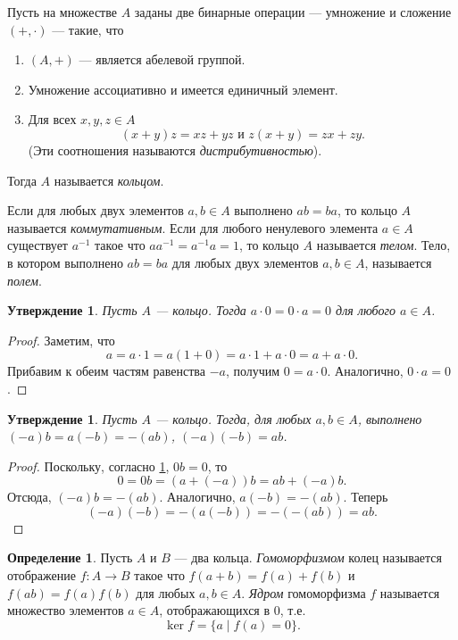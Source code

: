 \documentclass[12pt, titlepage, oneside]{amsbook}
\newtheorem{claim}[theorem]{Утверждение}
\theoremstyle{definition}
\newtheorem{definition}[theorem]{Определение}
\theoremstyle{remark}
\begin{document}
Пусть на множестве $A$ заданы две бинарные операции --- умножение и
сложение $(+,\cdot)$ --- такие, что
\begin{enumerate}
	\item $(A,+)$ --- является абелевой группой.
	\item Умножение ассоциативно и
	      имеется единичный элемент.
	\item Для всех $x, y, z\in A$ $$(x+y)z=xz+yz\text{ и }
		      z(x+y)=zx+zy.$$ (Эти соотношения называются
	      \emph{дистрибутивностью}).
\end{enumerate}
Тогда $A$ называется \emph{кольцом}.

Если для любых двух элементов $a,b\in A$ выполнено $ab=ba$, то кольцо $A$ называется \emph{коммутативным}.
Если для любого ненулевого элемента $a\in A$ существует $a^{-1}$ такое что $aa^{-1}=a^{-1}a=1$, то кольцо $A$ называется \emph{телом}. Тело, в котором выполнено $ab=ba$ для любых двух элементов $a,b\in A$, называется \emph{полем}.

\begin{claim}
	\label{Kol0} Пусть $A$ --- кольцо. Тогда $a\cdot 0=0\cdot a=0$ для любого $a\in A$.
\end{claim}

\begin{proof}
	Заметим, что $$a=a\cdot 1=a(1+0)=a\cdot 1+a\cdot 0=a+a\cdot 0.$$ Прибавим к обеим частям равенства $-a$, получим $0=a\cdot 0$. Аналогично, $0\cdot a=0$.
\end{proof}

\begin{claim}
	\label{Kol00} Пусть $A$ --- кольцо. Тогда, для любых $a,b\in A$, выполнено $(-a)b=a(-b)=-(ab)$, $(-a)(-b)=ab$.
\end{claim}

\begin{proof}
	Поскольку, согласно \ref{Kol0}, $0b=0$, то $$0=0b=(a+(-a))b=ab+(-a)b.$$ Отсюда, $(-a)b=-(ab)$. Аналогично, $a(-b)=-(ab)$.
	Теперь $$(-a)(-b)=-(a(-b))=-(-(ab))=ab.$$
\end{proof}

\begin{definition}
	Пусть $A$ и $B$ --- два кольца. \emph{Гомоморфизмом} колец называется отображение $f\colon A\rightarrow B$ такое что $f(a+b)=f(a)+f(b)$ и $f(ab)=f(a)f(b)$ для любых $a,b\in A$. \emph{Ядром} гомоморфизма $f$ называется множество элементов $a\in A$, отображающихся в $0$, т.е. $$\ker f=\{a\mid f(a)=0\}.$$
\end{definition}
\end{document}
